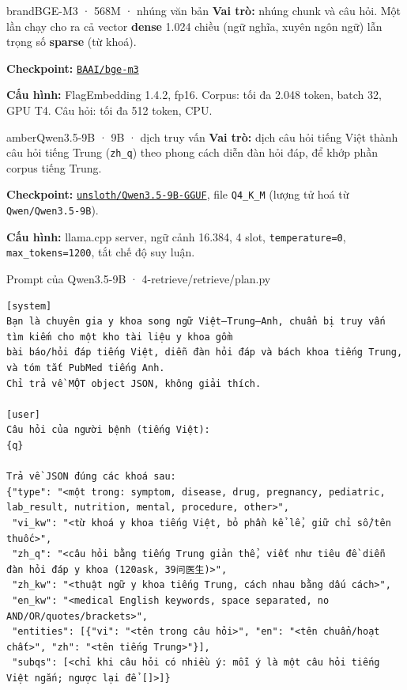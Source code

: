 \documentclass[10.5pt,a4paper]{article}
\begin{document}
\vspace{4pt}
\noindent\begin{minipage}[t]{0.49\linewidth}
\begin{card}{brand}{BGE-M3 · 568M · nhúng văn bản}
\small
\textbf{Vai trò:} nhúng chunk và câu hỏi. Một lần chạy cho ra cả vector \textbf{dense} 1.024 chiều (ngữ nghĩa, xuyên ngôn ngữ) lẫn trọng số \textbf{sparse} (từ khoá).\par
\textbf{Checkpoint:} \href{https://huggingface.co/BAAI/bge-m3}{\color{brand}\texttt{BAAI/bge-m3}}\par
\textbf{Cấu hình:} FlagEmbedding 1.4.2, fp16. Corpus: tối đa 2.048 token, batch 32, GPU T4. Câu hỏi: tối đa 512 token, CPU.
\end{card}
\end{minipage}\hfill
\begin{minipage}[t]{0.49\linewidth}
\begin{card}{amber}{Qwen3.5-9B · 9B · dịch truy vấn}
\small
\textbf{Vai trò:} dịch câu hỏi tiếng Việt thành câu hỏi tiếng Trung (\texttt{zh\_q}) theo phong cách diễn đàn hỏi đáp, để khớp phần corpus tiếng Trung.\par
\textbf{Checkpoint:} \href{https://huggingface.co/unsloth/Qwen3.5-9B-GGUF}{\color{brand}\texttt{unsloth/Qwen3.5-9B-GGUF}}, file \texttt{Q4\_K\_M} (lượng tử hoá từ \texttt{Qwen/Qwen3.5-9B}).\par
\textbf{Cấu hình:} llama.cpp server, ngữ cảnh 16.384, 4 slot, \texttt{temperature=0}, \texttt{max\_tokens=1200}, tắt chế độ suy luận.
\end{card}
\end{minipage}

\vspace{6pt}
\begin{codebox}{Prompt của Qwen3.5-9B · 4-retrieve/retrieve/plan.py}
\begin{Verbatim}[fontsize=\footnotesize]
[system]
Bạn là chuyên gia y khoa song ngữ Việt–Trung–Anh, chuẩn bị truy vấn tìm kiếm cho một kho tài liệu y khoa gồm
bài báo/hỏi đáp tiếng Việt, diễn đàn hỏi đáp và bách khoa tiếng Trung, và tóm tắt PubMed tiếng Anh.
Chỉ trả về MỘT object JSON, không giải thích.

[user]
Câu hỏi của người bệnh (tiếng Việt):
{q}

Trả về JSON đúng các khoá sau:
{"type": "<một trong: symptom, disease, drug, pregnancy, pediatric, lab_result, nutrition, mental, procedure, other>",
 "vi_kw": "<từ khoá y khoa tiếng Việt, bỏ phần kể lể, giữ chỉ số/tên thuốc>",
 "zh_q": "<câu hỏi bằng tiếng Trung giản thể, viết như tiêu đề diễn đàn hỏi đáp y khoa (120ask, 39问医生)>",
 "zh_kw": "<thuật ngữ y khoa tiếng Trung, cách nhau bằng dấu cách>",
 "en_kw": "<medical English keywords, space separated, no AND/OR/quotes/brackets>",
 "entities": [{"vi": "<tên trong câu hỏi>", "en": "<tên chuẩn/hoạt chất>", "zh": "<tên tiếng Trung>"}],
 "subqs": [<chỉ khi câu hỏi có nhiều ý: mỗi ý là một câu hỏi tiếng Việt ngắn; ngược lại để []>]}
\end{Verbatim}
\end{codebox}
\end{document}
